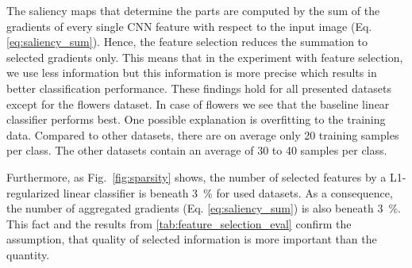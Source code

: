 \documentclass[runningheads]{llncs}
\newcommand{\pcent}[1]{\SI{#1}{\percent}}
\begin{document}
 
The saliency maps that determine the parts are computed by the sum of the gradients of every single CNN feature with respect to the input image (Eq. \ref{eq:saliency_sum}).
Hence, the feature selection reduces the summation to selected gradients only.
This means that in the experiment with feature selection, we use less information but this information is more precise which results in better classification performance.
These findings hold for all presented datasets except for the flowers dataset.
In case of flowers we see that the baseline linear classifier performs best.
One possible explanation is overfitting to the training data.
Compared to other datasets, there are on average only \num{20} training samples per class.
The other datasets contain an average of \num{30} to \num{40} samples per class.

Furthermore, as Fig.~\ref{fig:sparsity} shows, the number of selected features by a L1-regularized linear classifier is beneath \pcent{3} for used datasets.
As a consequence, the number of aggregated gradients (Eq. \ref{eq:saliency_sum}) is also beneath \pcent{3}.
This fact and the results from \autoref{tab:feature_selection_eval} confirm the assumption, that quality of selected information is more important than the quantity.
\end{document}
